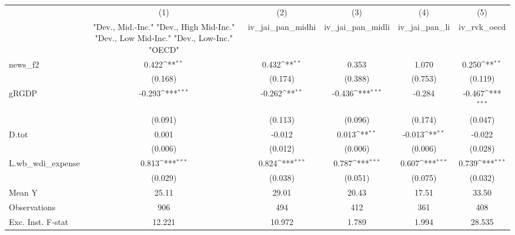 {
\def\sym#1{\ifmmode^{#1}\else\(^{#1}\)\fi}
\begin{tabular}{l*{5}{c}}
\toprule
            &\multicolumn{1}{c}{(1)}&\multicolumn{1}{c}{(2)}&\multicolumn{1}{c}{(3)}&\multicolumn{1}{c}{(4)}&\multicolumn{1}{c}{(5)}\\
            &\multicolumn{1}{c}{ "Dev., Mid.-Inc." "Dev., High Mid-Inc." "Dev., Low Mid-Inc." "Dev., Low-Inc." "OECD" }&\multicolumn{1}{c}{iv\_jai\_pan\_midhi}&\multicolumn{1}{c}{iv\_jai\_pan\_midli}&\multicolumn{1}{c}{iv\_jai\_pan\_li}&\multicolumn{1}{c}{iv\_rvk\_oecd}\\
\midrule
news\_f2     &       0.422\sym{**} &       0.432\sym{**} &       0.353         &       1.070         &       0.250\sym{**} \\
            &     (0.168)         &     (0.174)         &     (0.388)         &     (0.753)         &     (0.119)         \\
\addlinespace
gRGDP       &      -0.293\sym{***}&      -0.262\sym{**} &      -0.436\sym{***}&      -0.284         &      -0.467\sym{***}\\
            &     (0.091)         &     (0.113)         &     (0.096)         &     (0.174)         &     (0.047)         \\
\addlinespace
D.tot       &       0.001         &      -0.012         &       0.013\sym{**} &      -0.013\sym{**} &      -0.022         \\
            &     (0.006)         &     (0.012)         &     (0.006)         &     (0.006)         &     (0.028)         \\
\addlinespace
L.wb\_wdi\_expense&       0.813\sym{***}&       0.824\sym{***}&       0.787\sym{***}&       0.607\sym{***}&       0.739\sym{***}\\
            &     (0.029)         &     (0.038)         &     (0.051)         &     (0.075)         &     (0.032)         \\
\midrule
Mean Y      &       25.11         &       29.01         &       20.43         &       17.51         &       33.50         \\
Observations&         906         &         494         &         412         &         361         &         408         \\
Exc. Inst. F-stat&      12.221         &      10.972         &       1.789         &       1.994         &      28.535         \\
\bottomrule
\end{tabular}
}

